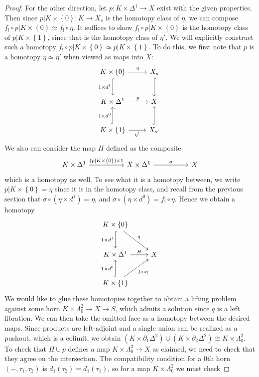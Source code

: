 \begin{proof}
	For the other direction, let $p : K\times \Delta ^1 \to X$ exist with the given properties. Then since $p|K\times \left\{ 0 \right\} : K \to X_s$ is the homotopy class of $\eta $, we can compose $f_! \circ p|K\times \left\{ 0 \right\} \simeq f_! \circ \eta $. It suffices to show $f_! \circ p|K\times \left\{ 0 \right\} $ is the homotopy class of $p|K\times \left\{ 1 \right\} $, since that is the homotopy class of $\eta '$. We will explicitly construct such a homotopy $f_! \circ p|K\times \left\{ 0 \right\} \simeq p|K\times \left\{ 1 \right\} $. To do this, we first note that $p$ is a homotopy $\eta \simeq \eta '$ when viewed as maps into $X$:
	\[\begin{tikzcd}[row sep = 2.5em, column sep = 2.5em]
	K\times \left\{ 0 \right\} \ar[" \eta  ", r] \ar[" 1\times d^1 "', hook, d]  & X_s \ar[hook, d]  \\
	K\times \Delta ^1 \ar[" p ", r] & X \\
	K\times \left\{ 1 \right\} \ar[" \eta ' "', r] \ar[" 1\times d^0 ", hook, u]  & X_{s'} \ar[hook, u] 
	\end{tikzcd}\]
	We also can consider the map $H$ defined as the composite
	\[\begin{tikzcd}[row sep = 2.5em, column sep = 5em]
	K\times \Delta ^1 \ar[" (p|K\times \left\{ 0 \right\} )\times 1 ", r]  & X\times \Delta ^1\ar[" \sigma  ", r]  & X
	\end{tikzcd}\]
	which is a homotopy as well. To see what it is a homotopy between, we write $p|K\times \left\{ 0 \right\} =\eta $ since it is in the homotopy class, and recall from the previous section that $\sigma \circ (\eta \times d^1)=\eta$, and $\sigma \circ (\eta \times d^0)=f_!\circ \eta $. Hence we obtain a homotopy
	\[\begin{tikzcd}[row sep = 2.5em, column sep = 2.5em]
	K\times \left\{ 0 \right\} \ar[" 1\times d^1 "', hook, d] \ar[" \eta  ", dr]  &  \\
	K\times \Delta ^1 \ar[" H ", r]  & X \\
	K\times \left\{ 1 \right\} \ar[" 1\times d^0 ", hook, u] \ar[" f_! \circ \eta  "', ur]  & 
	\end{tikzcd}\]
	We would like to glue these homotopies together to obtain a lifting problem against some horn $K\times \Lambda _0^2\to X\to S$, which admits a solution since $q$ is a left fibration. We can then take the omitted face as a homotopy between the desired maps. Since products are left-adjoint and a single union can be realized as a pushout, which is a colimit, we obtain $(K\times \partial_1\Delta ^2)\cup (K\times \partial _2\Delta ^2) \cong K\times \Lambda _0^2$. To check that $H \cup p$ defines a map $K\times \Lambda _0^2 \to X$ as claimed, we need to check that they agree on the intersection. Tbe compatibility condition for a 0th horn $(-,\tau _1,\tau _2)$ is $d_1(\tau _2)=d_1(\tau _1)$, so for a map $K\times \Lambda _0^2$ we must check

\end{proof}
